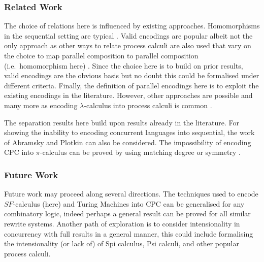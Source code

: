\documentclass{llncs}
\newcommand{\withrw}[1]{#1}
\begin{document}
\withrw{
\vspace*{-0.3cm}
\subsubsection*{Related Work}

The choice of relations here is influenced by existing approaches.
Homomorphisms in the sequential setting are typical \cite{Curry58combinatorylogic,Barendregt85,Felleisen199135}.
Valid encodings are popular \cite{G:IC08,G:DC10,G:CONCUR08,LPSS10,LVF10,gla12}
albeit not the only approach as other ways to relate process calculi are also used
that vary on the choice to map parallel composition to parallel composition (i.e.~homomorphism here)
\cite{journals/corr/cs-PL-9809008,journals/iandc/BusiGZ00,DeNicola:2006:EPK:1148743.1148750,DBLP:journals/corr/abs-1011-6436,gla12}.
Since the choice here is to build on prior results, valid encodings are the obvious
basis 
but no doubt this could be formalised
under different criteria.
Finally, the definition of parallel encodings here is to exploit the existing
encodings in the literature. 
However, other approaches are possible
\cite{90426,parrow.victor:fusion-calculus} and
many more as encoding $\lambda$-calculus into process calculi is common
\cite{96717,milner.parrow.ea:calculus-mobile,1998:MobileAmbients,citeulike:500640}.

The separation results here build upon results already in the literature.
For showing the inability to encoding concurrent languages into sequential, the
work of Abramsky \cite{Abramsky90thelazy} and Plotkin \cite{Plotkin97fullabstraction} can also be considered.
The impossibility of encoding CPC into $\pi$-calculus can be proved by using
matching degree or symmetry \cite[proofs for Theorem~7.2.5]{GivenWilsonPHD}.

}


\vspace*{-0.3cm}
\subsubsection*{Future Work}
Future work may proceed along several directions.
The techniques used to encode $SF$-calculus (here) and Turing Machines \cite{givenwilson:hal-00987594}
into CPC can be generalised for any combinatory logic,
indeed perhaps a general result can be proved for all similar rewrite systems.
Another path of exploration is to consider intensionality in concurrency with full results in a general manner,
this could include formalising the intensionality (or lack of) of Spi calculus, Psi calculi, and other popular process calculi.

\vspace*{-0.3cm}


\end{document}
